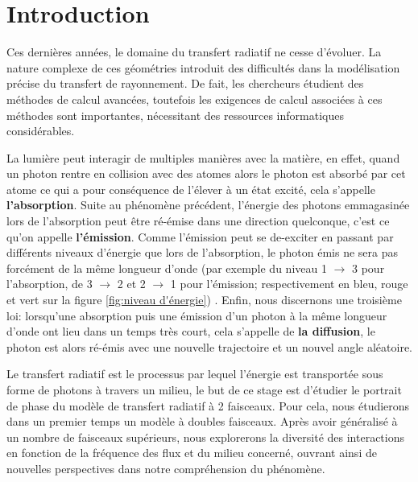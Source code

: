 \documentclass[12pt]{article}
\begin{document}
\section{Introduction}

Ces dernières années, le domaine du transfert radiatif ne cesse d'évoluer. La nature complexe de ces géométries introduit des difficultés dans la modélisation précise du transfert de rayonnement. De fait, les chercheurs étudient des méthodes de calcul avancées, toutefois les exigences de calcul associées à ces méthodes sont importantes, nécessitant des ressources informatiques considérables.

La lumière peut interagir de multiples manières avec la matière, en effet, quand un photon rentre en collision avec des atomes alors le photon est absorbé par cet atome ce qui a pour conséquence de l'élever à un état excité, cela s'appelle \textbf{l'absorption}.
Suite au phénomène précédent, l'énergie des photons emmagasinée lors de l'absorption peut être ré-émise dans une direction quelconque, c'est ce qu'on appelle \textbf{l'émission}. 
Comme l'émission peut se de-exciter en passant par différents niveaux d'énergie que lors de l'absorption, le photon émis ne sera pas forcément de la même longueur d'onde (par exemple du niveau 1 $\rightarrow$ 3 pour l'absorption, de 3 $\rightarrow$ 2 et 2 $\rightarrow$ 1 pour l'émission; respectivement en bleu, rouge et vert sur la figure \ref{fig:niveau d'énergie}) \cite{cour_lumière}. %
Enfin, nous discernons une troisième loi: lorsqu'une absorption puis une émission d'un photon à la même longueur d'onde ont lieu dans un temps très court, cela s'appelle de \textbf{la diffusion}, le photon est alors ré-émis avec une nouvelle trajectoire et un nouvel angle aléatoire. \par 

Le transfert radiatif est le processus par lequel l'énergie est transportée sous forme de photons à travers un milieu, le but de ce stage est d'étudier le portrait de phase du modèle de transfert radiatif à 2 faisceaux. Pour cela, nous étudierons dans un premier temps un modèle à doubles faisceaux. Après avoir généralisé à un nombre de faisceaux supérieurs, nous explorerons la diversité des interactions en fonction de la fréquence des flux et du milieu concerné, ouvrant ainsi de nouvelles perspectives dans notre compréhension du phénomène. 
\end{document}
